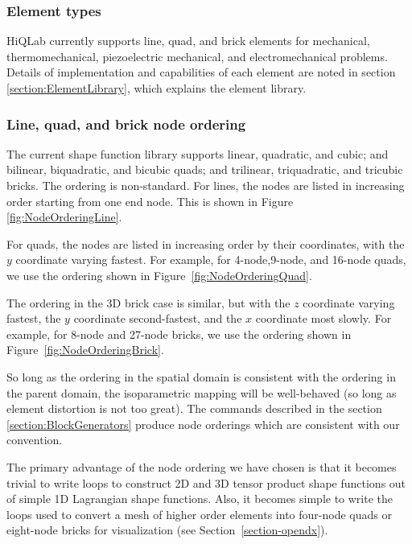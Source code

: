 \subsubsection{Element types}
HiQLab currently supports line, quad, and brick elements for 
mechanical, thermomechanical, piezoelectric mechanical, and 
electromechanical problems. Details of implementation and
capabilities of each element are noted in section \ref{section:ElementLibrary},
which explains the element library.   

\subsubsection{Line, quad, and brick node ordering}
The current shape function library supports linear, quadratic, 
and cubic; and bilinear, biquadratic, and
bicubic quads; and trilinear, triquadratic, and tricubic bricks.  The
ordering is non-standard. For lines, the nodes are listed in
increasing order starting from one end node. This is shown in
Figure \ref{fig:NodeOrderingLine}.  

For quads, the nodes are listed in
increasing order by their coordinates, with the $y$ coordinate varying
fastest.  
For example, for 4-node,9-node, and 16-node quads, we use the
ordering shown in Figure~\ref{fig:NodeOrderingQuad}.  

The ordering in the
3D brick case is similar, but with the $z$ coordinate varying fastest, the
$y$ coordinate second-fastest, and the $x$ coordinate most slowly.
For example, for 8-node and 27-node bricks, we use the
ordering shown in Figure~\ref{fig:NodeOrderingBrick}.  

So long as the ordering in the spatial domain is consistent with the
ordering in the parent domain, the isoparametric mapping will be
well-behaved (so long as element distortion is not too great).  The
 commands described in the section
\ref{section:BlockGenerators} produce node orderings which are
consistent with our convention.

The primary advantage of the node ordering we have chosen is that it
becomes trivial to write loops to construct 2D and 3D tensor product
shape functions out of simple 1D Lagrangian shape functions.  Also, it
becomes simple to write the loops used to convert a mesh of higher
order elements into four-node quads or eight-node bricks for
visualization (see Section~\ref{section-opendx}).



